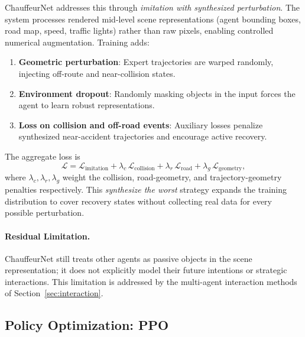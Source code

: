 \documentclass[12pt, a4paper]{article}
\begin{document}
ChauffeurNet addresses this through \emph{imitation with synthesized perturbation}.
The system processes rendered mid-level scene representations (agent bounding
boxes, road map, speed, traffic lights) rather than raw pixels, enabling controlled
numerical augmentation. Training adds:
\begin{enumerate}[noitemsep]
  \item \textbf{Geometric perturbation}: Expert trajectories are warped
        randomly, injecting off-route and near-collision states.
  \item \textbf{Environment dropout}: Randomly masking objects in the input forces
        the agent to learn robust representations.
  \item \textbf{Loss on collision and off-road events}: Auxiliary losses penalize
        synthesized near-accident trajectories and encourage active recovery.
\end{enumerate}
The aggregate loss is
\begin{equation}
  \mathcal{L} = \mathcal{L}_{\text{imitation}}
              + \lambda_c\,\mathcal{L}_{\text{collision}}
              + \lambda_r\,\mathcal{L}_{\text{road}}
              + \lambda_g\,\mathcal{L}_{\text{geometry}},
\end{equation}
where $\lambda_c, \lambda_r, \lambda_g$ weight the collision, road-geometry, and
trajectory-geometry penalties respectively. This \emph{synthesize the worst}
strategy expands the training distribution to cover recovery states without
collecting real data for every possible perturbation.

\paragraph{Residual Limitation.}
ChauffeurNet still treats other agents as passive objects in the scene
representation; it does not explicitly model their future intentions or strategic
interactions. This limitation is addressed by the multi-agent interaction methods
of Section~\ref{sec:interaction}.

\subsection{Policy Optimization: PPO}
\label{sec:ppo}
\end{document}
